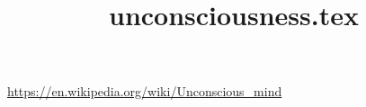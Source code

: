 \documentclass[a4paper]{article}
\title{unconsciousness.tex}
\date{}
\begin{document}
    \maketitle

    \url{https://en.wikipedia.org/wiki/Unconscious_mind}
\end{document}
